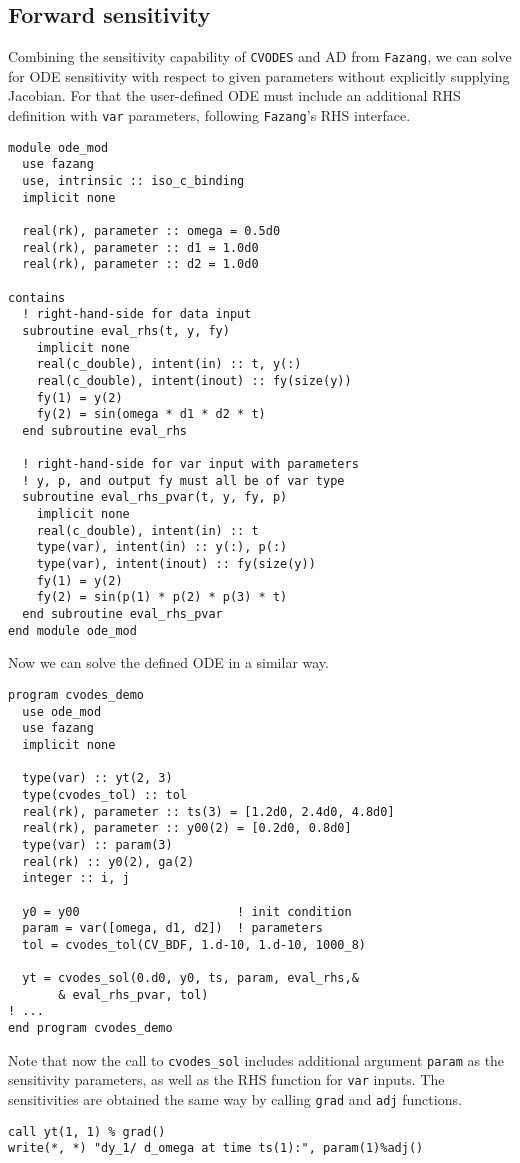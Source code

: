 \documentclass[12pt, reqno, oneside]{amsbook}
\numberwithin{equation}{chapter}
\begin{document}
\subsection{Forward sensitivity}
\label{sec:org5755bfa}
Combining the sensitivity capability of \texttt{CVODES} and AD from \texttt{Fazang},
we can solve for ODE sensitivity with respect to given parameters
without explicitly supplying Jacobian. For that the user-defined ODE
must include an additional RHS definition with \texttt{var} parameters,
following \texttt{Fazang}'s RHS interface.
\begin{verbatim}
module ode_mod
  use fazang
  use, intrinsic :: iso_c_binding
  implicit none

  real(rk), parameter :: omega = 0.5d0
  real(rk), parameter :: d1 = 1.0d0
  real(rk), parameter :: d2 = 1.0d0

contains
  ! right-hand-side for data input
  subroutine eval_rhs(t, y, fy)
    implicit none
    real(c_double), intent(in) :: t, y(:)
    real(c_double), intent(inout) :: fy(size(y))
    fy(1) = y(2)
    fy(2) = sin(omega * d1 * d2 * t)
  end subroutine eval_rhs

  ! right-hand-side for var input with parameters
  ! y, p, and output fy must all be of var type
  subroutine eval_rhs_pvar(t, y, fy, p)
    implicit none
    real(c_double), intent(in) :: t
    type(var), intent(in) :: y(:), p(:)
    type(var), intent(inout) :: fy(size(y))
    fy(1) = y(2)
    fy(2) = sin(p(1) * p(2) * p(3) * t)
  end subroutine eval_rhs_pvar
end module ode_mod
\end{verbatim}
Now we can solve the defined ODE in a similar way.
\begin{verbatim}
program cvodes_demo
  use ode_mod
  use fazang
  implicit none

  type(var) :: yt(2, 3)
  type(cvodes_tol) :: tol
  real(rk), parameter :: ts(3) = [1.2d0, 2.4d0, 4.8d0]
  real(rk), parameter :: y00(2) = [0.2d0, 0.8d0]
  type(var) :: param(3)
  real(rk) :: y0(2), ga(2)
  integer :: i, j

  y0 = y00                      ! init condition
  param = var([omega, d1, d2])  ! parameters
  tol = cvodes_tol(CV_BDF, 1.d-10, 1.d-10, 1000_8)

  yt = cvodes_sol(0.d0, y0, ts, param, eval_rhs,&
       & eval_rhs_pvar, tol)
! ...
end program cvodes_demo
\end{verbatim}
Note that now the call to \texttt{cvodes\_sol} includes additional argument
\texttt{param} as the sensitivity parameters, as well as the RHS function for
\texttt{var} inputs. The sensitivities are obtained the same way by calling
\texttt{grad} and \texttt{adj} functions.
\begin{verbatim}
call yt(1, 1) % grad()
write(*, *) "dy_1/ d_omega at time ts(1):", param(1)%adj()
\end{verbatim}
\end{document}

